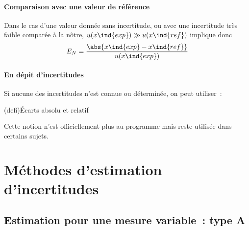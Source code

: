 \documentclass[../../main/main.tex]{subfiles}
\begin{document}
\paragraph*{Comparaison avec une valeur de référence}
Dans le cas d'une valeur donnée sans incertitude, ou avec une incertitude
très faible comparée à la nôtre, $u(x\ind{exp}) \gg u(x\ind{ref})$ implique
donc
\[
	E_N = \frac{\abs{x\ind{exp} - x\ind{ref}}}{u(x\ind{exp})}
\]

\paragraph*{En dépit d'incertitudes}
Si aucune des incertitudes n'est connue ou déterminée, on peut utiliser~:

\begin{tcb*}[sidebyside](defi){Écarts absolu et relatif}
	\psw{%
		\[
			\ep = \abs{x\ind{exp} - x\ind{ref}}
			\vphantom{\abs{\frac{x\ind{exp} - x\ind{ref}}{x\ind{ref}}}}
		\]
	}%
	\tcblower
	\psw{%
		\[
			\ep_r = \abs{\frac{x\ind{exp} - x\ind{ref}}{x\ind{ref}}}
		\]
	}%
\end{tcb*}

Cette notion n'est officiellement plus au programme mais reste utilisée dans
certains sujets.

\section{Méthodes d'estimation d'incertitudes}
\subsection{Estimation pour une mesure variable~: type A}
\end{document}
